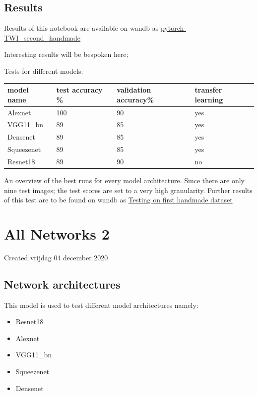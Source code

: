 \documentclass{article}
\begin{document}
\subsection{Results}

Results of this notebook are available on wandb as \href{https://wandb.ai/dplars/pytorch-TWI_second_handmade?workspace=user-dplars}{pytorch-TWI\_second\_handmade}



Interesting results will be bespoken here;

Tests for different models: 

\begin{tabular}{ |l|l|l|l| }
\hline
 model name & test accuracy \% & validation accuracy\% & transfer learning \tabularnewline
\hline
\hline
 Alexnet & 100 & 90 & yes \tabularnewline
\hline
 VGG11\_bn & 89 & 85 & yes \tabularnewline
\hline
 Densenet & 89 & 85 & yes \tabularnewline
\hline
 Squeezenet & 89 & 85 & yes \tabularnewline
\hline
 Resnet18 & 89 & 90 & no \tabularnewline
\hline
\end{tabular}
										

An overview of the best runs for every model architecture. Since there are only nine test images; the test scores are set to a very high granularity. Further results of this test are to be found on wandb as \href{https://wandb.ai/dplars/pytorch-TWI_second_handmade/reports/Testing-on-first-handmade-dataset--VmlldzozNTE5NzM}{Testing on first handmade dataset}


		\section{All Networks 2}

Created vrijdag 04 december 2020



\subsection{Network architectures}

This model is used to test different model architectures namely:

\begin{itemize}
\item Resnet18
\item Alexnet
\item VGG11\_bn
\item Squeezenet
\item Densenet
\end{itemize}
\end{document}
